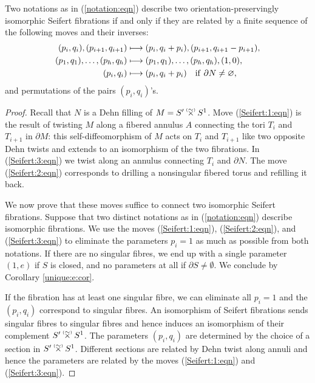 \begin{prop} \label{S:moves:prop}
Two notations as in (\ref{notation:eqn}) describe two orientation-preservingly isomorphic Seifert fibrations if and only if they are related by a finite sequence of the following moves and their inverses:
\begin{align}
(p_i,q_i), (p_{i+1},q_{i+1}) & \longmapsto (p_i, q_i+p_i), (p_{i+1},q_{i+1}-p_{i+1}), \label{Seifert:1:eqn} \\
(p_1,q_1), \ldots, (p_h, q_h) & \longmapsto (p_1,q_1), \ldots, (p_h, q_h), (1,0), \label{Seifert:2:eqn} \\
(p_i,q_i) & \longmapsto (p_i,q_i+p_i) \quad {\rm if}\ \partial N \neq\emptyset, \label{Seifert:3:eqn}
\end{align}
and permutations of the pairs $(p_i,q_i)$'s.
\end{prop}
\begin{proof}
Recall that $N$ is a Dehn filling of $M=S'\timforsetil S^1$. Move (\ref{Seifert:1:eqn}) is the result of twisting $M$ along a fibered annulus $A$ connecting the tori $T_i$ and $T_{i+1}$ in $\partial M$: this self-diffeomorphism of $M$ acts on $T_i$ and $T_{i+1}$ like two opposite Dehn twists and extends to an isomorphism of the two fibrations. In (\ref{Seifert:3:eqn}) we twist along an annulus connecting $T_i$ and $\partial N$. The move (\ref{Seifert:2:eqn}) corresponds to drilling a nonsingular fibered torus and refilling it back.

We now prove that these moves suffice to connect two isomorphic Seifert fibrations. 
Suppose that two distinct notations as in (\ref{notation:eqn}) describe isomorphic fibrations. 
We use the moves (\ref{Seifert:1:eqn}), (\ref{Seifert:2:eqn}), and (\ref{Seifert:3:eqn}) to eliminate the parameters $p_i=1$ as much as possible from both notations. If there are no singular fibres, we end up with a single parameter $(1,e)$ if $S$ is closed, and no parameters at all if $\partial S \neq \emptyset$. We conclude by Corollary \ref{unique:e:cor}. 

If the fibration has at least one singular fibre, we can eliminate all $p_i=1$ and the $(p_i,q_i)$ correspond to singular fibres. An isomorphism of Seifert fibrations sends singular fibres to singular fibres and hence induces an isomorphism of their complement $S'\timforsetil S^1$. The parameters $(p_i,q_i)$ are determined by the choice of a section in $S'\timforsetil S^1$. Different sections are related by Dehn twist along annuli and hence the parameters are related by the moves (\ref{Seifert:1:eqn}) and (\ref{Seifert:3:eqn}).
\end{proof}

